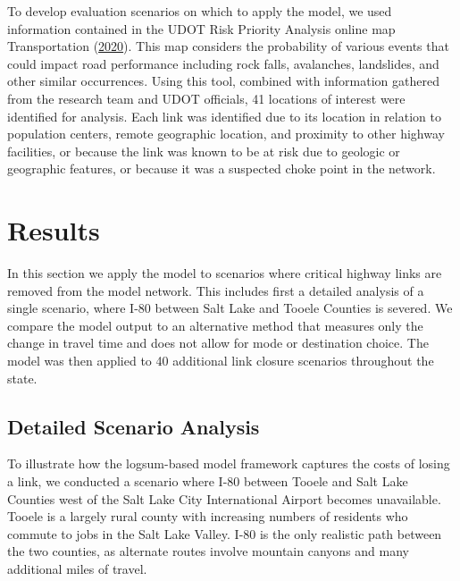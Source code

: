 \documentclass[]{ascelike-new}
\begin{document}
To develop evaluation scenarios on which to apply the model, we used
information contained in the UDOT Risk Priority Analysis online map
Transportation (\protect\hyperlink{ref-UDOT2020}{2020}). This map
considers the probability of various events that could impact road
performance including rock falls, avalanches, landslides, and other
similar occurrences. Using this tool, combined with information gathered
from the research team and UDOT officials, 41 locations of interest were
identified for analysis. Each link was identified due to its location in
relation to population centers, remote geographic location, and
proximity to other highway facilities, or because the link was known to
be at risk due to geologic or geographic features, or because it was a
suspected choke point in the network.


\hypertarget{sec-results}{%
\section{Results}\label{sec-results}}

In this section we apply the model to scenarios where critical highway
links are removed from the model network. This includes first a detailed
analysis of a single scenario, where I-80 between Salt Lake and Tooele
Counties is severed. We compare the model output to an alternative
method that measures only the change in travel time and does not allow
for mode or destination choice. The model was then applied to 40
additional link closure scenarios throughout the state.

\hypertarget{detailed-scenario-analysis}{%
\subsection{Detailed Scenario
Analysis}\label{detailed-scenario-analysis}}

To illustrate how the logsum-based model framework captures the costs of
losing a link, we conducted a scenario where I-80 between Tooele and
Salt Lake Counties west of the Salt Lake City International Airport
becomes unavailable. Tooele is a largely rural county with increasing
numbers of residents who commute to jobs in the Salt Lake Valley. I-80
is the only realistic path between the two counties, as alternate routes
involve mountain canyons and many additional miles of travel.
\end{document}
